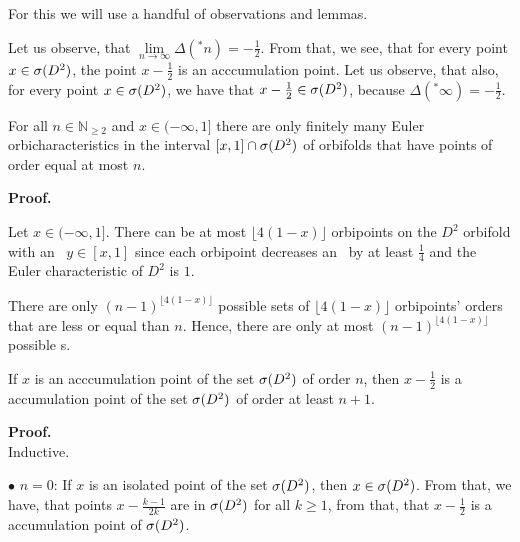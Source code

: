 For this we will use  
a handful of observations and lemmas. 
\begin{observation}\label{accumulation_points_are_in_the_spectrum}
Let us observe, that $\lim\limits_{n \to \infty} \Delta(^\ast n) = -\frac{1}{2}$. From that, 
we see, 
that for every point $x \in {{\sigma}(D^2)}$, the point $x - \frac{1}{2}$ is an acccumulation point. 
Let us observe, that also, for every point $x \in {{\sigma}(D^2)}$, we have that $x - \frac{1}{2} 
\in {{\sigma}(D^2)}$, 
because $\Delta(^\ast \infty) = -\frac{1}{2}$. 
\end{observation}

\begin{lemma}\label{finiteness_lemma}
For all $n \in \mathbb{N}_{\geq 2}$ and $x \in (-\infty, 1]$ there are only finitely 
many Euler orbicharacteristics
in the interval $[x,1] \cap {{\sigma}(D^2)}$ of orbifolds that have points of order equal 
at most $n$. 
\end{lemma}
\textbf{Proof.} 

Let $x \in (-\infty, 1]$. There can be at most $\lfloor 4(1-x) \rfloor$ orbipoints on the 
$D^2$ orbifold 
with an \Eoc\ $y \in [x,1]$ since each orbipoint decreases an \Eoc\ by at least $\frac{1}{4}$ 
and the Euler characteristic of $D^2$ is $1$. 

There are only $(n-1)^{\lfloor 4(1-x) \rfloor}$ possible sets of $\lfloor 4(1-x) \rfloor$ 
orbipoints' orders that are less or equal than $n$. Hence, there are only at most 
$(n-1)^{\lfloor 4(1-x) \rfloor}$ possible \Eoc s.


\begin{lemma}\label{first_order_lemma}
If $x$ is an acccumulation point of the set ${{\sigma}(D^2)}$ of order $n$, then $x-\frac{1}{2}$ is a
 accumulation point of the set ${{\sigma}(D^2)}$ of order at least $n+1$. 
\end{lemma}
\noindent\textbf{Proof.} \\
Inductive. 

$\bullet$ $n = 0$: If $x$ is an isolated point of the set ${{\sigma}(D^2)}$, then $x \in {{\sigma}(D^2)}$. 
From that, we 
have, that points $x - \frac{k-1}{2k}$ are in ${{\sigma}(D^2)}$ for all $k \geq 1$, from that, that 
$x-\frac{1}{2}$ is a 
accumulation point of ${{\sigma}(D^2)}$. 


